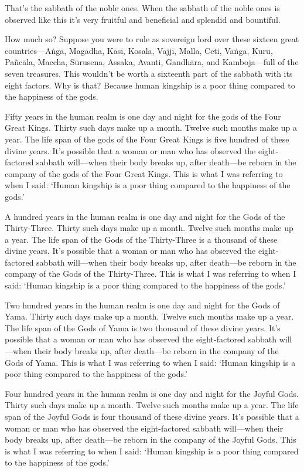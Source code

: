 \documentclass[12pt,openany]{book}%
\begin{document}
That’s the sabbath of the noble ones. When the sabbath of the noble ones is observed like this it’s very fruitful and beneficial and splendid and bountiful. 

How much so? Suppose you were to rule as sovereign lord over these sixteen great countries—\textsanskrit{Aṅga}, Magadha, \textsanskrit{Kāsī}, Kosala, \textsanskrit{Vajjī}, Malla, Ceti, \textsanskrit{Vaṅga}, Kuru, \textsanskrit{Pañcāla}, Maccha, \textsanskrit{Sūrusena}, Assaka, Avanti, \textsanskrit{Gandhāra}, and Kamboja—full of the seven treasures. This wouldn’t be worth a sixteenth part of the sabbath with its eight factors. Why is that? Because human kingship is a poor thing compared to the happiness of the gods. 

Fifty years in the human realm is one day and night for the gods of the Four Great Kings. Thirty such days make up a month. Twelve such months make up a year. The life span of the gods of the Four Great Kings is five hundred of these divine years. It’s possible that a woman or man who has observed the eight-factored sabbath will—when their body breaks up, after death—be reborn in the company of the gods of the Four Great Kings. This is what I was referring to when I said: ‘Human kingship is a poor thing compared to the happiness of the gods.’ 

A hundred years in the human realm is one day and night for the Gods of the Thirty-Three. Thirty such days make up a month. Twelve such months make up a year. The life span of the Gods of the Thirty-Three is a thousand of these divine years. It’s possible that a woman or man who has observed the eight-factored sabbath will—when their body breaks up, after death—be reborn in the company of the Gods of the Thirty-Three. This is what I was referring to when I said: ‘Human kingship is a poor thing compared to the happiness of the gods.’ 

Two hundred years in the human realm is one day and night for the Gods of Yama. Thirty such days make up a month. Twelve such months make up a year. The life span of the Gods of Yama is two thousand of these divine years. It’s possible that a woman or man who has observed the eight-factored sabbath will—when their body breaks up, after death—be reborn in the company of the Gods of Yama. This is what I was referring to when I said: ‘Human kingship is a poor thing compared to the happiness of the gods.’ 

Four hundred years in the human realm is one day and night for the Joyful Gods. Thirty such days make up a month. Twelve such months make up a year. The life span of the Joyful Gods is four thousand of these divine years. It’s possible that a woman or man who has observed the eight-factored sabbath will—when their body breaks up, after death—be reborn in the company of the Joyful Gods. This is what I was referring to when I said: ‘Human kingship is a poor thing compared to the happiness of the gods.’ 
\end{document}
